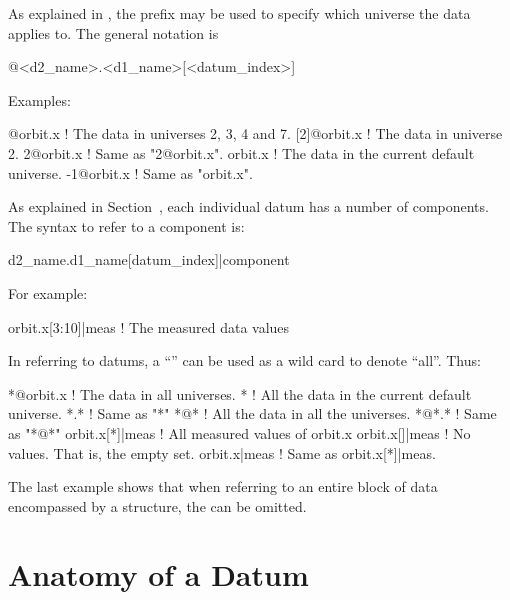 As explained in , the prefix  may
be used to specify which universe the data applies to. The general notation is
\begin{example}
  @<d2_name>.<d1_name>[<datum_index>]
\end{example}
Examples:
\begin{example}
  [2:4,7]@orbit.x ! The  data in universes 2, 3, 4 and 7.
  [2]@orbit.x     ! The  data in universe 2. 
  2@orbit.x       ! Same as "2@orbit.x".
  orbit.x         ! The  data in the current default universe.
  -1@orbit.x      ! Same as "orbit.x".
\end{example}

As explained in Section~, each individual datum has a number of components. The
syntax to refer to a component is:
\begin{example}
  d2_name.d1_name[datum_index]|component
\end{example}
For example:
\begin{example}
  orbit.x[3:10]|meas     ! The measured data values
\end{example}

In referring to datums, a ``\vn{*}'' can be used as a wild card to 
denote ``all''. Thus:
\begin{example}
  *@orbit.x       ! The  data in all universes.
  *               ! All the data in the current default universe.
  *.*             ! Same as "*"
  *@*             ! All the data in all the universes. 
  *@*.*           ! Same as "*@*"
  orbit.x[*]|meas ! All measured values of orbit.x
  orbit.x[]|meas  ! No values. That is, the empty set.
  orbit.x|meas    ! Same as orbit.x[*]|meas.
\end{example}
The last example shows that when referring to an entire block of data
encompassed by a  structure, the \vn{[*]} can be omitted.

\section{Anatomy of a Datum}
\label{s:data.anatomy}

